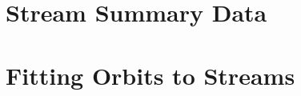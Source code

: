 \documentclass[final,5p,times,twocolumn,authoryear]{elsarticle}
\begin{document}


\appendix

\section{Stream Summary Data}
\label{apx:stream-summary}


\clearpage

\restoregeometry

\clearpage

\restoregeometry

\clearpage

\restoregeometry

\clearpage

\restoregeometry

\clearpage

\section{Fitting Orbits to Streams}
\label{apx:stream-fit}

%
\end{document}
